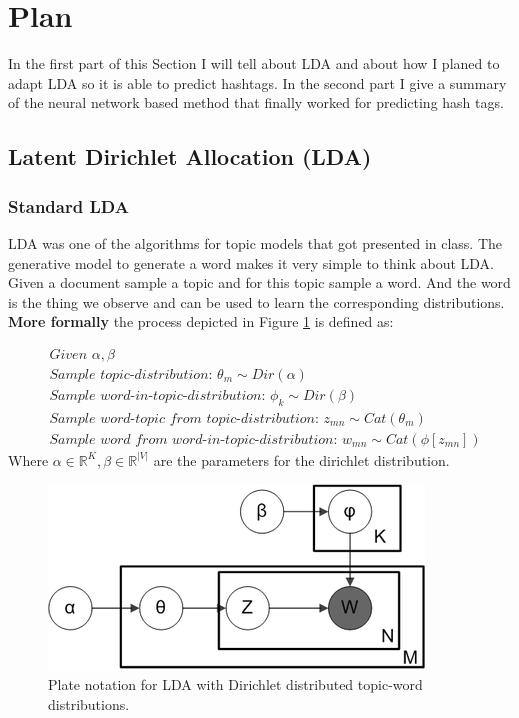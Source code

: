 \documentclass[10pt,conference,compsocconf]{IEEEtran}
\newcommand\R{\mathbb{R}}
\begin{document}
\section{Plan}
\label{sec:Plan}
In the first part of this Section I will tell about LDA and about how I planed to adapt LDA so it is able to predict hashtags. In the second part I give a summary of the neural network based method that finally worked for predicting hash tags. 
\subsection{Latent Dirichlet Allocation (LDA)}
\subsubsection{Standard LDA}
LDA was one of the algorithms for topic models that got presented in class. The generative model to generate a word makes it very simple to think about LDA. Given a document sample a topic and for this topic sample a word. And the word is the thing we observe and can be used to learn the corresponding distributions. \\
\textbf{More formally} the process depicted in Figure \ref{fig:ldaplate} is defined as: 

\small
\begin{align*}
&\textit{Given } \alpha, \beta \\
&\textit{Sample topic-distribution: } \theta_m \sim Dir(\alpha)\\
&\textit{Sample word-in-topic-distribution: } \phi_k \sim Dir(\beta) \\
&\textit{Sample word-topic from topic-distribution: } z_{mn} \sim Cat(\theta_m) \\
&\textit{Sample word from word-in-topic-distribution: } w_{mn} \sim Cat(\phi[z_{mn}])
\end{align*}
\normalsize
Where $\alpha \in \R^K, \beta \in \R^{|V|}$ are the parameters for the dirichlet distribution. 

\begin{figure}
	\centering
	\includegraphics[width=0.7\linewidth]{images/lda_plate}
	\caption{Plate notation for LDA with Dirichlet distributed topic-word distributions.}
	\label{fig:ldaplate}
\end{figure}
\end{document}
